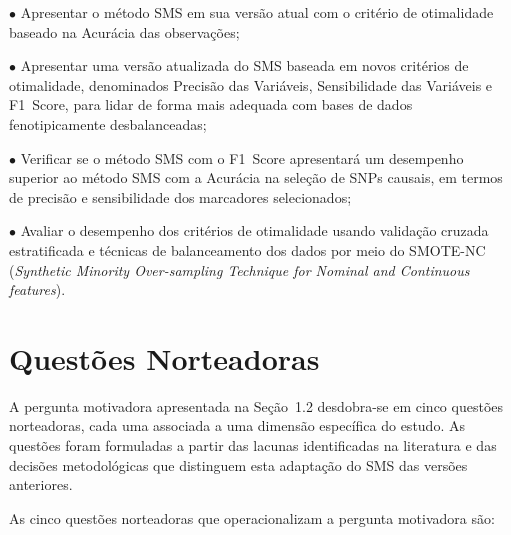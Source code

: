 \documentclass[
    12pt,
    a4paper,
    oneside,
    english,
    french,
    spanish,
    brazil
    ]{abntex2}
\begin{document}
$\bullet$ Apresentar o método SMS em sua versão atual com o critério de otimalidade baseado na Acurácia das observações;

$\bullet$ Apresentar uma versão atualizada do SMS baseada em novos critérios de otimalidade, denominados Precisão das Variáveis, Sensibilidade das Variáveis e F1~Score, para lidar de forma mais adequada com bases de dados fenotipicamente desbalanceadas;

$\bullet$ Verificar se o método SMS com o F1~Score apresentará um desempenho superior ao método SMS com a Acurácia na seleção de SNPs causais, em termos de precisão e sensibilidade dos marcadores selecionados;

$\bullet$ Avaliar o desempenho dos critérios de otimalidade usando validação cruzada estratificada e técnicas de balanceamento dos dados por meio do SMOTE-NC (\textit{Synthetic Minority Over-sampling Technique for Nominal and Continuous features}).

\section{Questões Norteadoras}
\label{sec:questoes}

A pergunta motivadora apresentada na Seção~1.2 desdobra-se em cinco questões norteadoras, cada uma associada a uma dimensão específica do estudo. As questões foram formuladas a partir das lacunas identificadas na literatura e das decisões metodológicas que distinguem esta adaptação do SMS das versões anteriores.

\bigskip
\noindent As cinco questões norteadoras que operacionalizam a pergunta motivadora são:
\end{document}
